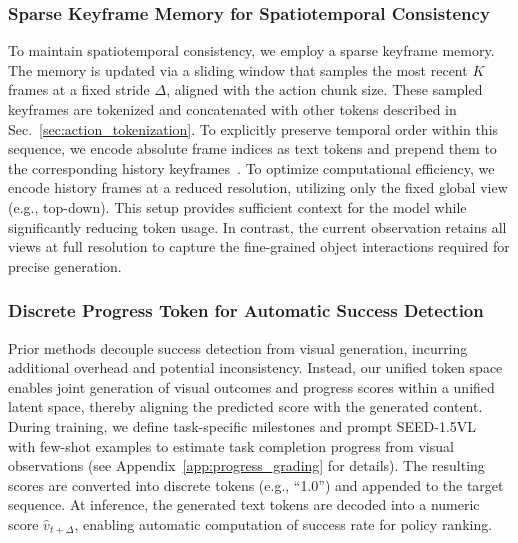 \subsubsection{Sparse Keyframe Memory for Spatiotemporal Consistency}
\label{sec:training_history}



To maintain spatiotemporal consistency, we employ a sparse keyframe memory. The memory is updated via a sliding window that samples the most recent $K$ frames at a fixed stride $\Delta$, aligned with the action chunk size. These sampled keyframes are tokenized and concatenated with other tokens described in Sec.~\ref{sec:action_tokenization}. To explicitly preserve temporal order within this sequence, we encode absolute frame indices as text tokens and prepend them to the corresponding history keyframes~\cite{guo2025seed1}.
To optimize computational efficiency, we encode history frames at a reduced resolution, utilizing only the fixed global view (e.g., top-down). This setup provides sufficient context for the model while significantly reducing token usage. In contrast, the current observation retains all views at full resolution to capture the fine-grained object interactions required for precise generation.

\subsubsection{Discrete Progress Token for Automatic Success Detection}
\label{sec:training_score}
Prior methods decouple success detection from visual generation, incurring additional overhead and potential inconsistency. Instead, our unified token space enables joint generation of visual outcomes and progress scores within a unified latent space, thereby aligning the predicted score with the generated content.
During training, we define task-specific milestones and prompt SEED-1.5VL~\cite{guo2025seed1} with few-shot examples to estimate task completion progress from visual observations (see Appendix~\ref{app:progress_grading} for details). The resulting scores are converted into discrete tokens (e.g., ``1.0'') and appended to the target sequence.
At inference, the generated text tokens are decoded into a numeric score $\hat{v}_{t+\Delta}$, enabling automatic computation of success rate for policy ranking.

